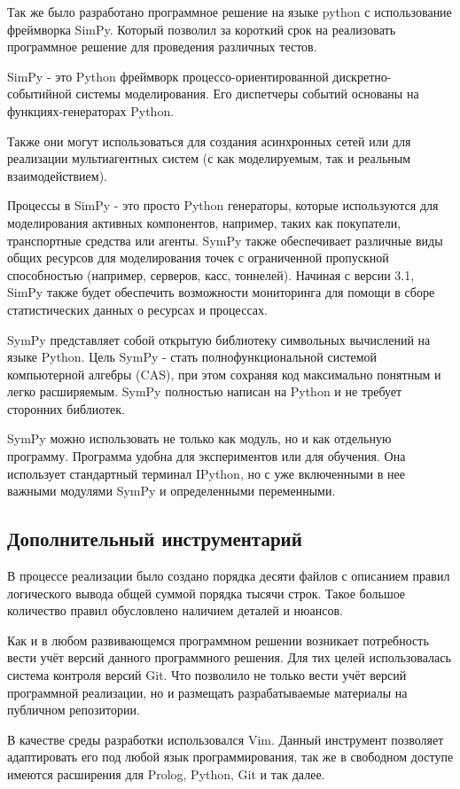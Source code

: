 	Так же было разработано программное решение на языке python с использование фреймворка SimPy.
		Который позволил за короткий срок на реализовать программное решение для проведения различных тестов.  

	SimPy - это Python фреймворк процессо-ориентированной дискретно-событийной системы моделирования. Его диспетчеры событий основаны на функциях-генераторах Python.

	Также они могут использоваться для создания асинхронных сетей или для реализации мультиагентных систем (с как моделируемым, так и реальным взаимодействием).

	Процессы в SimPy - это просто Python генераторы, которые используются для моделирования активных компонентов, например, таких как покупатели, транспортные средства или агенты. SymPy также обеспечивает различные виды общих ресурсов для моделирования точек с ограниченной пропускной способностью (например, серверов, касс, тоннелей). Начиная с версии 3.1, SimPy также будет обеспечить возможности мониторинга для помощи в сборе статистических данных о ресурсах и процессах. 

	SymPy представляет собой открытую библиотеку символьных вычислений на языке Python. Цель SymPy - стать полнофункциональной системой компьютерной алгебры (CAS), при этом сохраняя код максимально понятным и легко расширяемым. SymPy полностью написан на Python и не требует сторонних библиотек.

	SymPy можно использовать не только как модуль, но и как отдельную программу. Программа удобна для экспериментов или для обучения. Она использует стандартный терминал IPython, но с уже включенными в нее важными модулями SymPy и определенными переменными.

	\subsection{Дополнительный инструментарий}

		В процессе реализации было создано порядка десяти файлов с описанием правил логического вывода
			общей суммой порядка тысячи строк. Такое большое количество правил обусловлено наличием деталей и нюансов.

		Как и в любом развивающемся программном решении возникает потребность вести учёт версий данного
			программного решения. Для тих целей использовалась система контроля версий Git.
			Что позволило не только вести учёт версий программной реализации,
			но и размещать разрабатываемые материалы на публичном репозитории.

		В качестве среды разработки использовался Vim. Данный инструмент позволяет адаптировать его
			под любой язык программирования, так же в свободном доступе имеются расширения для Prolog,
			Python, Git и так далее.
